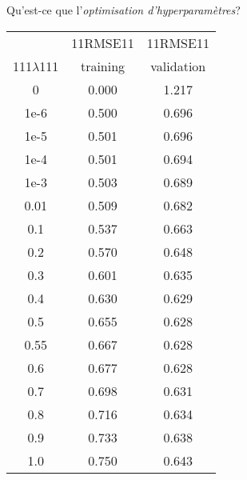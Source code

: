 \begin{frame}{\small Qu'est-ce que \Large l'\textit{optimisation d'hyperparam\`etres}?}
\begin{multicols}{2}
\columnbreak

	\begin{flushright}
	 \begin{minipage}{5.0cm}

	\begin{center}
	\begin{tabular}{|c|c|c|}
	\hline
	                  & {\color{white}11}RMSE{\color{white}11} & {\color{white}11}RMSE{\color{white}11} \\
	{\color{white}111}$\lambda${\color{white}111} & training & validation \\
	\hline\hline
	0 & 0.000 & 1.217 \\
	1e-6 & 0.500 & 0.696 \\
	1e-5 & 0.501 & 0.696 \\
	1e-4 & 0.501 & 0.694 \\
	1e-3 & 0.503 & 0.689 \\
	0.01 & 0.509 & 0.682 \\
	0.1 & 0.537 & 0.663 \\
	0.2 & 0.570 & 0.648 \\
	0.3 & 0.601 & 0.635 \\
	0.4 & 0.630 & 0.629 \\
	0.5 & 0.655 & 0.628 \\
	{\color{red}0.55} & 0.667 & {\color{red}0.628} \\
	0.6 & 0.677 & 0.628 \\
	0.7 & 0.698 & 0.631 \\
	0.8 & 0.716 & 0.634 \\
	0.9 & 0.733 & 0.638 \\
	1.0 & 0.750 & 0.643 \\
	\hline
	\end{tabular}
	\end{center}

	\end{minipage}
	\end{flushright}

\end{multicols}

\end{frame}
\normalsize

